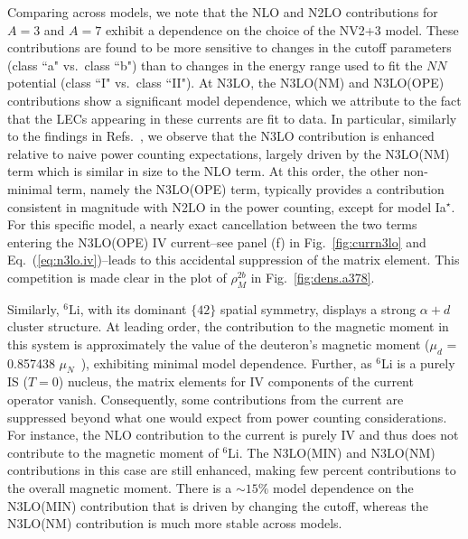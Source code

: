 \documentclass[aps,prc,floatfix,showpacs,twocolumn, preprintnumbers]{revtex4-2}
\begin{document}
Comparing across models, we note that the NLO and N2LO contributions for $A=3$ and $A=7$ exhibit a dependence on the choice of the NV2+3 model. These contributions are found to be more sensitive to changes in the cutoff parameters (class ``a" vs.~class ``b") than to changes in the energy range used to fit the $N\!N$ potential (class ``I" vs.~class ``II"). At N3LO, the N3LO(NM) and N3LO(OPE) contributions show a significant model dependence, which we attribute to the fact that the LECs appearing in these currents are fit to data. In particular, similarly to the findings in Refs.~\cite{Gnech:2022vwr,Martin:2023dhl}, we observe that the N3LO contribution is enhanced relative to naive power counting expectations, largely driven by the N3LO(NM) term which is similar in size to the NLO term. At this order, the other non-minimal term, namely the N3LO(OPE) term, typically provides a contribution consistent in magnitude with N2LO in the power counting, except for model Ia$^{\star}$. For this specific model, a nearly exact cancellation between the two terms entering the N3LO(OPE) IV current--see panel (f) in Fig.~\ref{fig:currn3lo} and Eq.~(\ref{eq:n3lo.iv})--leads to this accidental suppression of the matrix element. This competition is made clear in the plot of  $\rho_M^{2b}$ in Fig.~\ref{fig:dens.a378}. 

Similarly, $^6$Li, with its dominant $\{42\}$ spatial symmetry, displays a strong $\alpha+d$ cluster structure. At leading order, the contribution to the magnetic moment in this system is approximately the value of the deuteron's magnetic moment ($\mu_d$ = 0.857438 $\mu_N$~\cite{Tiesinga:2021myr}), exhibiting minimal model dependence. Further, as $^6$Li is a purely IS ($T=0$) nucleus, the matrix elements for IV components of the current operator vanish. Consequently, some contributions from the current are suppressed beyond what one would expect from power counting considerations. For instance, the NLO contribution to the current is purely IV and thus does not contribute to the magnetic moment of $^6$Li. The N3LO(MIN) and N3LO(NM) contributions in this case are still enhanced, making few percent contributions to the overall magnetic moment. There is a ${\sim}15\%$ model dependence on the N3LO(MIN) contribution that is driven by changing the cutoff, whereas the N3LO(NM) contribution is much more stable across models. 
\end{document}
